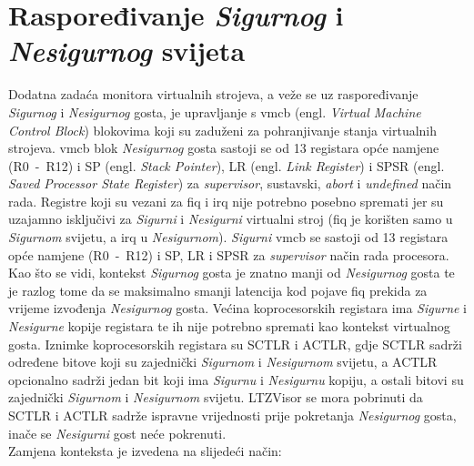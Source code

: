\documentclass[times, utf8, diplomski, numeric]{fer}
\begin{document}
\section{Raspoređivanje \textit{Sigurnog} i \textit{Nesigurnog} svijeta}
Dodatna zadaća monitora virtualnih strojeva, a veže se uz raspoređivanje \textit{Sigurnog} i \textit{Nesigurnog} gosta, je upravljanje s
\gls{vmcb} (engl. \textit{Virtual Machine Control Block}) blokovima koji su zaduženi za pohranjivanje stanja virtualnih strojeva.
\gls{vmcb} blok \textit{Nesigurnog} gosta sastoji se od 13 registara opće namjene (R0~-~R12) i SP (engl. \textit{Stack Pointer}), LR
(engl. \textit{Link Register}) i SPSR (engl. \textit{Saved Processor State Register}) za \textit{supervisor}, sustavski,
\textit{abort} i \textit{undefined} način rada. Registre koji su vezani za \gls{fiq} i \gls{irq} nije potrebno posebno spremati jer su
uzajamno isključivi za \textit{Sigurni} i \textit{Nesigurni} virtualni stroj (\gls{fiq} je korišten samo u \textit{Sigurnom} svijetu, a \gls{irq} u \textit{Nesigurnom}).
\textit{Sigurni} \gls{vmcb} se sastoji od 13 registara opće namjene (R0~-~R12) i SP, LR i SPSR za \textit{supervisor} način rada procesora.
Kao što se vidi, kontekst \textit{Sigurnog} gosta je znatno manji od \textit{Nesigurnog} gosta te je razlog tome da se maksimalno smanji
latencija kod pojave \gls{fiq} prekida za vrijeme izvođenja \textit{Nesigurnog} gosta. Većina koprocesorskih registara ima \textit{Sigurne} i \textit{Nesigurne}
kopije registara te ih nije potrebno spremati kao kontekst virtualnog gosta. Iznimke koprocesorskih registara su SCTLR i
ACTLR, gdje SCTLR sadrži određene bitove koji su zajednički \textit{Sigurnom} i \textit{Nesigurnom} svijetu, a ACTLR opcionalno sadrži jedan
bit koji ima \textit{Sigurnu} i \textit{Nesigurnu} kopiju, a ostali bitovi su zajednički \textit{Sigurnom} i \textit{Nesigurnom} svijetu. LTZVisor se mora pobrinuti
da SCTLR i ACTLR sadrže ispravne vrijednosti prije pokretanja \textit{Nesigurnog} gosta, inače se \textit{Nesigurni} gost neće pokrenuti.\\
Zamjena konteksta je izvedena na slijedeći način:
\end{document}
